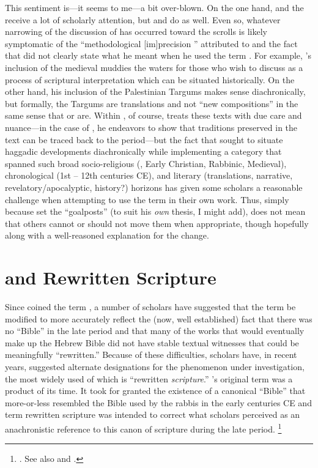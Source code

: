 This sentiment is---it seems to me---a bit over-blown. On the one hand, \ga and the \templescroll receive a lot of scholarly attention, but \jub and \ant do as well. Even so, whatever narrowing of the discussion of \rwb has occurred toward the \qumran scrolls is likely symptomatic of the ``methodological [im]precision '' attributed to  and the fact that \vermes did not clearly state what he meant when he used the term \rwB. For example, \vermes's inclusion of the medieval \sefer muddies the waters for those who wish to discuss \rwb as a process of scriptural interpretation which can be situated historically. On the other hand, his inclusion of the Palestinian Targums makes sense diachronically, but formally, the Targums are translations and not ``new compositions'' in the same sense that \jub or \ga are. Within , of course, \vermes treats these texts with due care and nuance---in the case of \sefer, he endeavors to show that traditions preserved in the text can be traced back to the \secondtemple period---but the fact that \vermes sought to situate haggadic developments diachronically while implementing a category that spanned such broad socio-religious (\qumran, Early Christian, Rabbinic, Medieval), chronological (1st -- 12th centuries CE), and literary (translations, narrative, revelatory/apocalyptic, history?) horizons has given some scholars a reasonable challenge when attempting to use the term in their own work. Thus, simply because \vermes set the ``goalposts'' (to suit his \emph{own} thesis, I might add), does not mean that others cannot or should not move them when appropriate, though hopefully along with a well-reasoned explanation for the change. 

\section{\RWB and Rewritten Scripture}

Since \vermes coined the term \rwb, a number of scholars have suggested that the term be modified to more accurately reflect the (now, well established) fact that there was no ``Bible'' in the late \secondtemple period and that many of the works that would eventually make up the Hebrew Bible did not have stable textual witnesses that could be meaningfully ``rewritten.'' Because of these difficulties, scholars have, in recent years, suggested alternate designations for the phenomenon under investigation, the most widely used of which is ``rewritten \emph{scripture}.'' \vermes's original term \rwb was a product of its time. It took for granted the existence of a canonical ``Bible'' that more-or-less resembled the Bible used by the rabbis in the early centuries CE and term rewritten scripture was intended to correct what scholars perceived as an anachronistic reference to this canon of scripture during the late \secondtemple period.%
    \footnote{%
        \cite[58--59]{campbell_zsengeller2014}. See also
        \cite{ulrich_mcdonald-sanders2002} and 
        \cite{ulrich_zsengeller2014}.}


